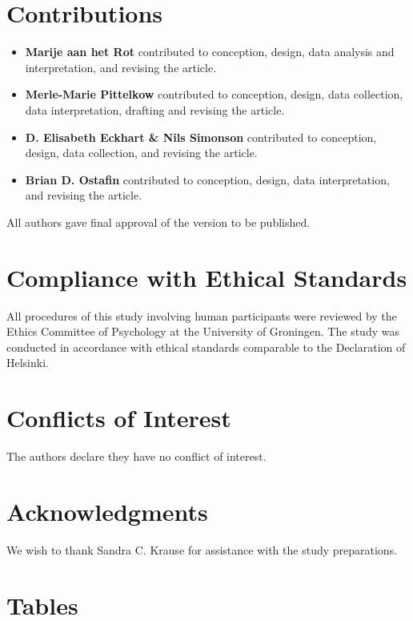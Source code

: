 \documentclass[authordate, empirical]{jote-new-article}
\begin{document}
    \section{Contributions}
    \begin{itemize}
        \item \textbf{Marije aan het Rot} contributed to conception, design, data analysis and interpretation, and revising the article.
        \item \textbf{Merle-Marie Pittelkow} contributed to conception, design, data collection, data interpretation, drafting and revising the article.
        \item \textbf{D. Elisabeth Eckhart \& Nils Simonson} contributed to conception, design, data collection, and revising the article. 
        \item \textbf{Brian D. Ostafin} contributed to conception, design, data interpretation, and revising the article.
    \end{itemize} 
    All authors gave final approval of the version to be published.
    

	\section{Compliance with Ethical Standards}



	All procedures of this study involving human participants were reviewed by the Ethics Committee of Psychology at the University of Groningen.\emph{\textbf{ }}The study was conducted in accordance with ethical standards comparable to the Declaration of Helsinki.



	\section{Conflicts of Interest}

	The authors declare they have no conflict of interest.


	\section{Acknowledgments}

	We wish to thank Sandra C. Krause for assistance with the study preparations.


\printbibliography
\clearpage

\section{Tables}
\end{document}
